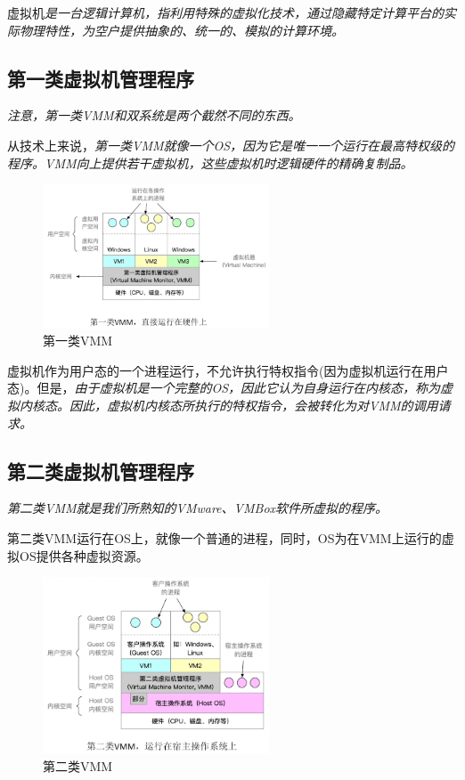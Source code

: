     虚拟机\emph{是一台逻辑计算机，指利用特殊的虚拟化技术，通过隐藏特定计算平台的实际物理特性，为空户提供抽象的、统一的、模拟的计算环境。}

\subsection{第一类虚拟机管理程序}

    \emph{注意，第一类VMM和双系统是两个截然不同的东西。}

    从技术上来说，\emph{第一类VMM就像一个OS，因为它是{\color{red}唯一一个运行在最高特权级的程序}。VMM向上提供若干虚拟机，这些虚拟机时逻辑硬件的精确复制品。}

\begin{figure}[!htbp]
    \centering
    \includegraphics[width=0.6\textwidth]{image/chapter01/第一类VMM.png}
    \caption{第一类VMM}
\end{figure}

    虚拟机作为用户态的一个进程运行，不允许执行特权指令(因为虚拟机运行在用户态)。但是，\emph{由于虚拟机是一个完整的OS，因此它认为自身运行在内核态，称为虚拟内核态。因此，虚拟机内核态所执行的特权指令，会被转化为{\color{red}对VMM的调用请求}。}

\subsection{第二类虚拟机管理程序}

    \emph{第二类VMM就是我们所熟知的VMware、VMBox软件所虚拟的程序。}

    第二类VMM运行在OS上，就像一个普通的进程，同时，OS为在VMM上运行的虚拟OS提供各种虚拟资源。

\begin{figure}[!htbp]
    \centering
    \includegraphics[width=0.6\textwidth]{image/chapter01/第二类VMM.png}
    \caption{第二类VMM}
\end{figure}

